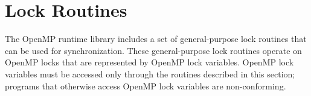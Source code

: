 %
%
%
%
%
%
%
%
%
%
%
%
%


\section{Lock Routines}
\label{sec:Lock Routines}
The OpenMP runtime library includes a set of general-purpose lock 
routines that can be used for synchronization. These general-purpose 
lock routines operate on OpenMP locks that are represented by OpenMP 
lock variables. OpenMP lock variables must be accessed only through 
the routines described in this section; programs that otherwise
access OpenMP lock variables are non-conforming.

